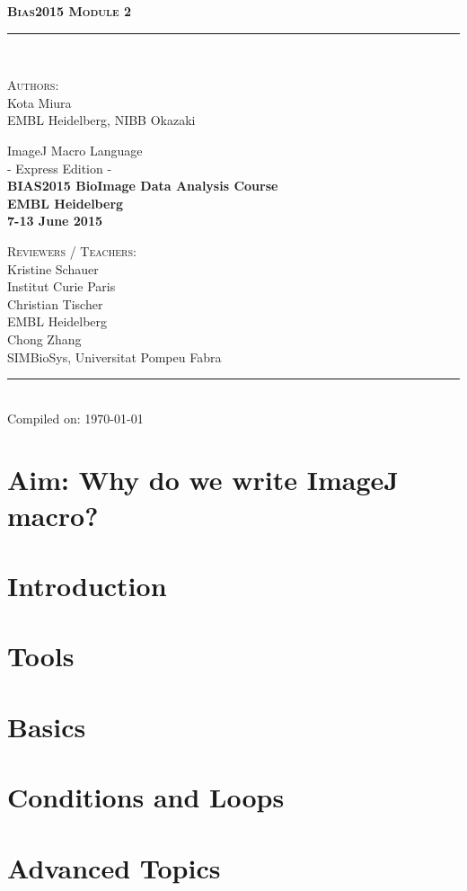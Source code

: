 \documentclass[11pt,a4paper,oneside]{report}
\newcommand{\HRule}{\rule{\linewidth}{0.5mm}}
\newcommand*{\titleTH}{\begingroup
\raggedleft
\textsc{\textbf{\Large{Bias2015 \hfill Module 2}}}
\HRule\\
\vspace*{\baselineskip}

\hfill \textsc{\large Authors:}\\
[0.3\baselineskip]
\hfill {\Large Kota Miura}\\
{\small EMBL Heidelberg, NIBB Okazaki}\\
\vfill

{\textcolor{Medium}{\Huge ImageJ Macro Language}}\\
[\baselineskip]
{\Large - Express Edition -}\\
[2\baselineskip]

{\bfseries BIAS2015 BioImage Data Analysis Course}\\
\textbf{EMBL Heidelberg}\\
\textbf{7-13 June 2015}

\vfill

\hfill \textsc{Reviewers / Teachers:}\\
[0.3\baselineskip]
\hfill {\large Kristine Schauer}\\
\hfill {\small Institut Curie Paris}\\
[0.3\baselineskip]
\hfill {\large Christian Tischer}\\
\hfill {\small EMBL Heidelberg}\\
[0.3\baselineskip]
\hfill {\large Chong Zhang}\\
\hfill {\small SIMBioSys, Universitat Pompeu Fabra}\\
\HRule\\

{\small \hfill\textcolor{Medium}{ Compiled on: \today }}
\endgroup}
\begin{document}
\date{\today}

\pagestyle{empty}
\titleTH
\clearpage
\pagestyle{fancyplain}

\begingroup
\hypersetup{linkcolor=black}
\tableofcontents
\endgroup

\clearpage

\setcounter{chapter}{2}


\section{Aim: Why do we write ImageJ macro?}
  
  
\section{Introduction}
  

\newpage

\section{Tools}
\label{sec:tools}
 

\newpage

\section{Basics}
\label{sec:ImageJMacroBasics}

  
  
  

\newpage

\section{Conditions and Loops}
	
		

\newpage

\section{Advanced Topics}
\label{sec:advancedTopics}

  
  
  
  
  
  
\end{document}
